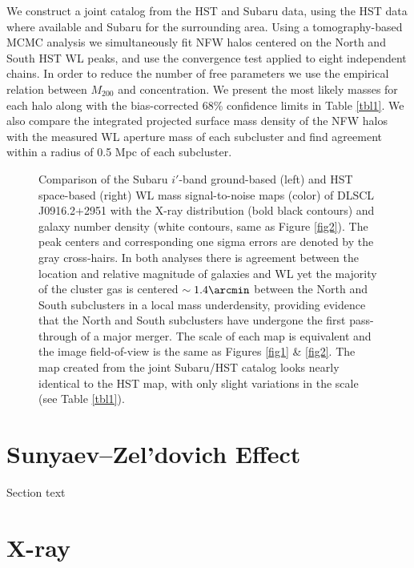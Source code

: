 We construct a joint catalog from the HST and Subaru data, using the HST data where available and Subaru for the surrounding area.
Using a tomography-based MCMC analysis we simultaneously fit NFW halos centered on the North and South HST WL peaks, and use the \citet{gelm96} convergence test applied to eight independent chains.
In order to reduce the number of free parameters we use the \citet{duff08} empirical relation between $M_{200}$ and concentration.
We present the most likely masses for each halo along with the bias-corrected 68\% confidence limits in Table \ref{tbl1}.
We also compare the integrated projected surface mass density of the NFW halos with the measured WL aperture mass \citep{fahl94} of each subcluster and find agreement within a radius of 0.5 Mpc of each subcluster.

\begin{figure}
\caption{Comparison of the Subaru $i'$-band ground-based (left) and HST space-based (right) WL mass signal-to-noise maps (color) of DLSCL J0916.2+2951 with the X-ray distribution (bold black contours) and galaxy number density (white contours, same as Figure \ref{fig2}). The peak centers and corresponding one sigma errors are denoted by the gray cross-hairs.
In both analyses there is agreement between the location and relative magnitude of galaxies and WL yet the majority of the cluster gas is centered $\sim1.4\arcmin$ between the North and South subclusters in a local mass underdensity, providing evidence that the North and South subclusters have undergone the first pass-through of a major merger.
The scale of each map is equivalent and the image field-of-view is the same as Figures \ref{fig1} \& \ref{fig2}.
The map created from the joint Subaru/HST catalog looks nearly identical to the HST map, with only slight variations in the scale (see Table \ref{tbl1}).
\label{fig3}}
\end{figure}

\section{Sunyaev--Zel'dovich Effect}

Section text

\section{X-ray}

